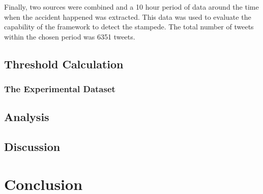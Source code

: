 Finally, two sources were combined and a 10 hour period of data around the time when the accident happened was extracted. This data was used to evaluate the capability of the framework to detect the stampede. The total number of tweets within the chosen period was 6351 tweets.

\subsection{Threshold Calculation}

\subsubsection{The Experimental Dataset}

\subsection{Analysis}

\subsection{Discussion}

\section{Conclusion}